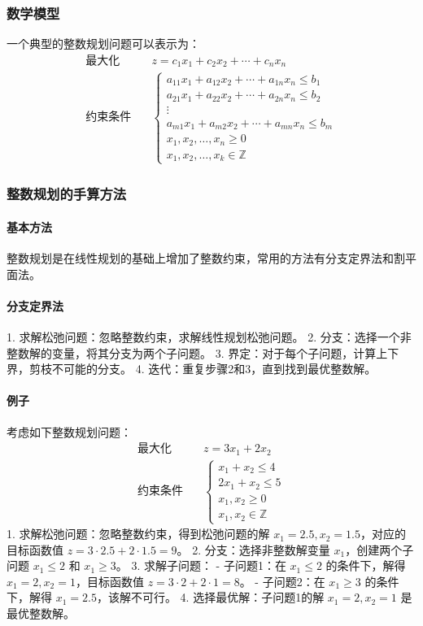 \documentclass[UTF8]{ctexart}
\begin{document}
\subsubsection {数学模型}
一个典型的整数规划问题可以表示为：
\[
\begin{aligned}
\text{最大化} & \quad z = c_1 x_1 + c_2 x_2 + \cdots + c_n x_n \\
\text{约束条件} & \quad 
\begin{cases}
a_{11} x_1 + a_{12} x_2 + \cdots + a_{1n} x_n \leq b_1 \\
a_{21} x_1 + a_{22} x_2 + \cdots + a_{2n} x_n \leq b_2 \\
\vdots \\
a_{m1} x_1 + a_{m2} x_2 + \cdots + a_{mn} x_n \leq b_m \\
x_1, x_2, \ldots, x_n \geq 0 \\
x_1, x_2, \ldots, x_k \in \mathbb{Z}
\end{cases}
\end{aligned}
\]

\subsubsection{整数规划的手算方法}
\paragraph{基本方法}
整数规划是在线性规划的基础上增加了整数约束，常用的方法有分支定界法和割平面法。
\paragraph{分支定界法}
1. 求解松弛问题：忽略整数约束，求解线性规划松弛问题。
2. 分支：选择一个非整数解的变量，将其分支为两个子问题。
3. 界定：对于每个子问题，计算上下界，剪枝不可能的分支。
4. 迭代：重复步骤2和3，直到找到最优整数解。

\paragraph{例子}
考虑如下整数规划问题：
\[
\begin{aligned}
\text{最大化} & \quad z = 3x_1 + 2x_2 \\
\text{约束条件} & \quad 
\begin{cases}
x_1 + x_2 \leq 4 \\
2x_1 + x_2 \leq 5 \\
x_1, x_2 \geq 0 \\
x_1, x_2 \in \mathbb{Z}
\end{cases}
\end{aligned}
\]
1. 求解松弛问题：忽略整数约束，得到松弛问题的解 \(x_1 = 2.5, x_2 = 1.5\)，对应的目标函数值 \(z = 3 \cdot 2.5 + 2 \cdot 1.5 = 9\)。
2. 分支：选择非整数解变量 \(x_1\)，创建两个子问题 \(x_1 \leq 2\) 和 \(x_1 \geq 3\)。
3. 求解子问题：
    - 子问题1：在 \(x_1 \leq 2\) 的条件下，解得 \(x_1 = 2, x_2 = 1\)，目标函数值 \(z = 3 \cdot 2 + 2 \cdot 1 = 8\)。
    - 子问题2：在 \(x_1 \geq 3\) 的条件下，解得 \(x_1 = 2.5\)，该解不可行。
4. 选择最优解：子问题1的解 \(x_1 = 2, x_2 = 1\) 是最优整数解。
\end{document}
